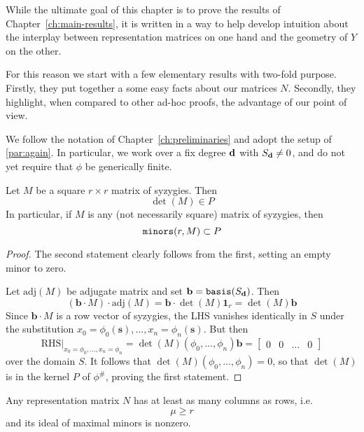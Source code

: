 \documentclass[fleqn,reqno]{amsart}
\begin{document}



\begin{paragraf*}
While the ultimate goal of this chapter is to prove the results of Chapter~\ref{ch:main-results},
it is written in a way to help develop intuition about the interplay between
representation matrices on one hand and the geometry of $Y$ on the other.

For this reason we start with a few elementary results with two-fold purpose.
Firstly, they put together a some easy facts about our matrices $N$.
Secondly, they highlight, when compared to other ad-hoc proofs, the advantage of our point of view.
\end{paragraf*}

\begin{paragraf*}
We follow the notation of Chapter~\ref{ch:preliminaries} and
adopt the setup of \eqref{par:again}.
In particular, we work over a fix degree $\mathbf d$ with $S_\mathbf d\neq0$,
and do not yet require that $\phi$ be generically finite.
\end{paragraf*}

\begin{lemma}
\label{lemma:detM-P}
Let $M$ be a square $r\times r$ matrix of syzygies.
Then
\[
	\det(M)\in P
\]
In particular, if $M$ is any (not necessarily square) matrix of syzygies, then
\[
	\mathop{\tt minors}(r,M)\subset P
\]
\end{lemma}

\begin{proof}
The second statement clearly follows from the first, setting an empty minor to zero.

Let $\text{adj}(M)$ be adjugate matrix and set $\mathbf b=\mathop{\tt basis}(S_\mathbf d)$.
Then
\[
	(\mathbf b\cdot M)\cdot\text{adj}(M)=\mathbf b\cdot\det(M)\mathbf 1_r=\det(M)\mathbf b
\]
Since $\mathbf b\cdot M$ is a row vector of syzygies,
the LHS vanishes identically in $S$ under the substitution
$x_0=\phi_0(\mathbf s),\ldots,x_n=\phi_n(\mathbf s)$.
But then
\[
	\text{RHS}|_{x_0=\phi_0,\ldots,x_n=\phi_n}=\det(M)(\phi_0,\ldots,\phi_n)\mathbf b=
	\begin{bmatrix}0& 0& \ldots& 0\end{bmatrix}
\]
over the domain $S$.
It follows that $\det(M)(\phi_0,\ldots,\phi_n)=0$,
so that $\det(M)$ is in the kernel $P$ of $\phi^\#$, proving the first statement.
\end{proof}

\begin{lemma}
\label{lemma:nonzero-detM}
Any representation matrix $N$ has at least as many columns as rows, i.e.
\[
	\mu\geq r
\]
and its ideal of maximal minors is nonzero.
\end{lemma}
\end{document}
